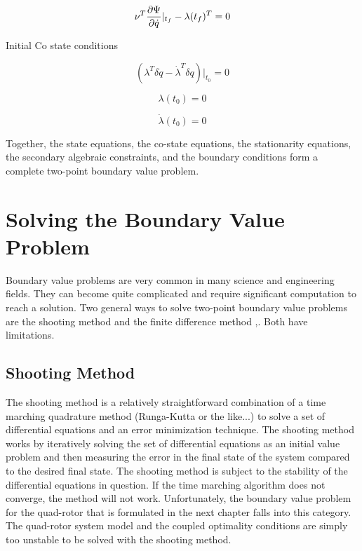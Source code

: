 \begin{equation}
    \nu^T \frac{\partial \Psi}{\partial \dot q}|_{t_f} - \lambda(t_f)^T = 0
\end{equation}


Initial Co state conditions

\begin{equation}
    ( \lambda^T \delta \dot q - \dot \lambda^T \delta q )|_{t_0} = 0
\end{equation}

\begin{equation}
    \lambda(t_0) = 0
\end{equation}

\begin{equation}
    \label{initialcostateder}
    \dot \lambda(t_0) = 0
\end{equation}

Together, the state equations, the co-state equations, the stationarity equations, the secondary algebraic constraints, and the boundary conditions form a complete two-point boundary value problem.


\section{Solving the Boundary Value Problem}

Boundary value problems are very common in many science and engineering fields. They can become quite complicated and require significant computation to reach a solution. Two general ways to solve two-point boundary value problems are the shooting method and the finite difference method \cite{keller1992numerical},\cite{rao2001applied}. Both have limitations.

\subsection{Shooting Method}

The shooting method is a relatively straightforward combination of a time marching quadrature method (Runga-Kutta or the like...) to solve a set of differential equations and an error minimization technique. The shooting method works by iteratively solving the set of differential equations as an initial value problem and then measuring the error in the final state of the system compared to the desired final state. The shooting method is subject to the stability of the differential equations in question. If the time marching algorithm does not converge, the method will not work. Unfortunately, the boundary value problem for the quad-rotor that is formulated in the next chapter falls into this category. The quad-rotor system model and the coupled optimality conditions are simply too unstable to be solved with the shooting method.

